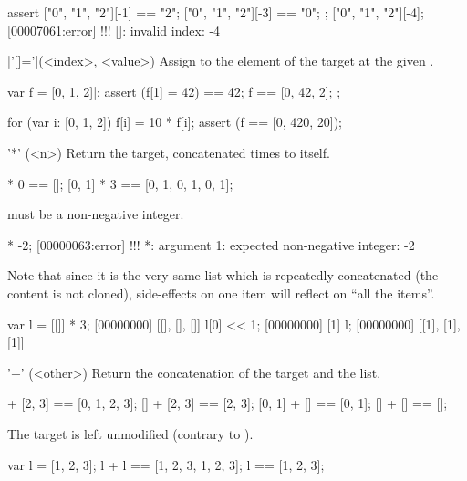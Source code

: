 \begin{urbiscriptapi}
\begin{urbiscript}
assert
{
  ["0", "1", "2"][-1] == "2";
  ["0", "1", "2"][-3] == "0";
};
["0", "1", "2"][-4];
[00007061:error] !!! []: invalid index: -4
\end{urbiscript}

\item|'[]='|(<index>, <value>)%
  Assign  to the element of the target at the given
  .

\begin{urbiscript}
var f = [0, 1, 2]|;
assert
{
  (f[1] = 42) == 42;
  f == [0, 42, 2];
};

for (var i: [0, 1, 2])
  f[i] = 10 * f[i];
assert (f == [0, 420, 20]);
\end{urbiscript}

\item['*'](<n>)%
  Return the target, concatenated  times to itself.
\begin{urbiassert}
[0, 1] * 0 == [];
[0, 1] * 3 == [0, 1, 0, 1, 0, 1];
\end{urbiassert}

   must be a non-negative integer.

\begin{urbiscript}
[0, 1] * -2;
[00000063:error] !!! *: argument 1: expected non-negative integer: -2
\end{urbiscript}


  Note that since it is the very same list which is repeatedly
  concatenated (the content is not cloned), side-effects on one item
  will reflect on ``all the items''.

\begin{urbiscript}
var l = [[]] * 3;
[00000000] [[], [], []]
l[0] << 1;
[00000000] [1]
l;
[00000000] [[1], [1], [1]]
\end{urbiscript}

\item['+'](<other>)%
  Return the concatenation of the target and the  list.

\begin{urbiassert}
[0, 1] + [2, 3] == [0, 1, 2, 3];
    [] + [2, 3] == [2, 3];
[0, 1] + []     == [0, 1];
    [] + []     == [];
\end{urbiassert}

The target is left unmodified (contrary to ).
\begin{urbiassert}
var l = [1, 2, 3];
l + l == [1, 2, 3, 1, 2, 3];
l     == [1, 2, 3];
\end{urbiassert}


\end{urbiscriptapi}
